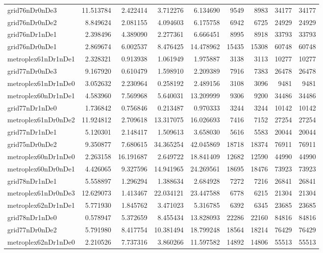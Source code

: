 \begin{longtable}{|l|r|r|r|r|r|r|r|r|}
grid76nDr0nDe3 & 11.513784 & 2.422414 & 3.712276 & 6.134690 & 9549 & 8983 & 34177 & 34177 \\
grid76nDr0nDe2 & 8.849624 & 2.081155 & 4.094603 & 6.175758 & 6942 & 6725 & 24929 & 24929 \\
grid76nDr1nDe1 & 2.398496 & 4.389090 & 2.277361 & 6.666451 & 8995 & 8918 & 33793 & 33793 \\
grid76nDr0nDe1 & 2.869674 & 6.002537 & 8.476425 & 14.478962 & 15435 & 15308 & 60748 & 60748 \\
metroplex61nDr1nDe1 & 2.328321 & 0.913938 & 1.061949 & 1.975887 & 3138 & 3113 & 10277 & 10277 \\
grid77nDr0nDe3 & 9.167920 & 0.610479 & 1.598910 & 2.209389 & 7916 & 7383 & 26478 & 26478 \\
metroplex61nDr1nDe0 & 3.052632 & 2.230964 & 0.258192 & 2.489156 & 3108 & 3096 & 9481 & 9481 \\
metroplex60nDr1nDe1 & 4.583960 & 7.569968 & 5.640031 & 13.209999 & 9306 & 9200 & 34486 & 34486 \\
grid77nDr1nDe0 & 1.736842 & 0.756846 & 0.213487 & 0.970333 & 3244 & 3244 & 10142 & 10142 \\
metroplex61nDr0nDe2 & 11.924812 & 2.709618 & 13.317075 & 16.026693 & 7416 & 7152 & 27254 & 27254 \\
grid77nDr1nDe1 & 5.120301 & 2.148417 & 1.509613 & 3.658030 & 5616 & 5583 & 20044 & 20044 \\
grid75nDr0nDe2 & 9.350877 & 7.680615 & 34.365254 & 42.045869 & 18718 & 18374 & 76911 & 76911 \\
metroplex60nDr1nDe0 & 2.263158 & 16.191687 & 2.649722 & 18.841409 & 12682 & 12590 & 44990 & 44990 \\
metroplex60nDr0nDe1 & 4.426065 & 9.327596 & 14.941965 & 24.269561 & 18695 & 18476 & 73923 & 73923 \\
grid78nDr1nDe1 & 5.558897 & 1.296294 & 1.388634 & 2.684928 & 7272 & 7216 & 26841 & 26841 \\
metroplex61nDr0nDe3 & 12.629073 & 1.413467 & 22.034121 & 23.447588 & 6778 & 6215 & 21304 & 21304 \\
metroplex62nDr1nDe1 & 5.771930 & 1.845762 & 3.471023 & 5.316785 & 6392 & 6345 & 23685 & 23685 \\
grid78nDr1nDe0 & 0.578947 & 5.372659 & 8.455434 & 13.828093 & 22286 & 22160 & 84816 & 84816 \\
grid77nDr0nDe2 & 5.791980 & 8.417754 & 10.381494 & 18.799248 & 18564 & 18214 & 76429 & 76429 \\
metroplex62nDr1nDe0 & 2.210526 & 7.737316 & 3.860266 & 11.597582 & 14892 & 14806 & 55513 & 55513 \\

\end{longtable}
